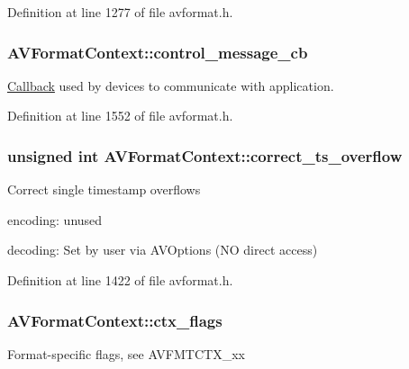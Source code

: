 Definition at line 1277 of file avformat.\+h.

\subsubsection[{\texorpdfstring{control\+\_\+message\+\_\+cb}{control_message_cb}}]{ A\+V\+Format\+Context\+::control\+\_\+message\+\_\+cb}\hypertarget{struct_a_v_format_context_ab569e23a4966ca1f708fb498dd6b3d5f}{}\label{struct_a_v_format_context_ab569e23a4966ca1f708fb498dd6b3d5f}
\hyperlink{class_callback}{Callback} used by devices to communicate with application. 

Definition at line 1552 of file avformat.\+h.

\subsubsection[{\texorpdfstring{correct\+\_\+ts\+\_\+overflow}{correct_ts_overflow}}]{\setlength{\rightskip}{0pt plus 5cm}unsigned {\bf int} A\+V\+Format\+Context\+::correct\+\_\+ts\+\_\+overflow}\hypertarget{struct_a_v_format_context_afe4c7f02033d4b58b3636b9e42db25de}{}\label{struct_a_v_format_context_afe4c7f02033d4b58b3636b9e42db25de}
Correct single timestamp overflows
\begin{DoxyItemize}
\item encoding\+: unused
\item decoding\+: Set by user via A\+V\+Options (NO direct access) 
\end{DoxyItemize}

Definition at line 1422 of file avformat.\+h.

\subsubsection[{\texorpdfstring{ctx\+\_\+flags}{ctx_flags}}]{ A\+V\+Format\+Context\+::ctx\+\_\+flags}\hypertarget{struct_a_v_format_context_a4e6076343df1ffc2e16cedbba3f3f397}{}\label{struct_a_v_format_context_a4e6076343df1ffc2e16cedbba3f3f397}
Format-\/specific flags, see A\+V\+F\+M\+T\+C\+T\+X\+\_\+xx 

